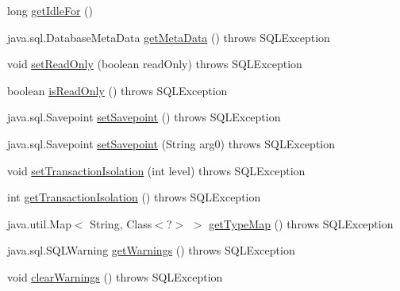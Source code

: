 \begin{DoxyCompactItemize}
long \mbox{\hyperlink{classcom_1_1mysql_1_1jdbc_1_1jdbc2_1_1optional_1_1_connection_wrapper_a5fe7514c30944bba398ec0412e78bd90}{get\+Idle\+For}} ()
\item 
java.\+sql.\+Database\+Meta\+Data \mbox{\hyperlink{classcom_1_1mysql_1_1jdbc_1_1jdbc2_1_1optional_1_1_connection_wrapper_a3f1b53d3626ae1b7897c99619155840f}{get\+Meta\+Data}} ()  throws S\+Q\+L\+Exception 
\item 
void \mbox{\hyperlink{classcom_1_1mysql_1_1jdbc_1_1jdbc2_1_1optional_1_1_connection_wrapper_ac530032d427efe9bd93fe09341ea0c9b}{set\+Read\+Only}} (boolean read\+Only)  throws S\+Q\+L\+Exception 
\item 
boolean \mbox{\hyperlink{classcom_1_1mysql_1_1jdbc_1_1jdbc2_1_1optional_1_1_connection_wrapper_a528d8fe8af6e92819391455e0e8e68ac}{is\+Read\+Only}} ()  throws S\+Q\+L\+Exception 
\item 
java.\+sql.\+Savepoint \mbox{\hyperlink{classcom_1_1mysql_1_1jdbc_1_1jdbc2_1_1optional_1_1_connection_wrapper_a6b97c71da72c7bb460e420e03078cb53}{set\+Savepoint}} ()  throws S\+Q\+L\+Exception 
\item 
java.\+sql.\+Savepoint \mbox{\hyperlink{classcom_1_1mysql_1_1jdbc_1_1jdbc2_1_1optional_1_1_connection_wrapper_ad8a366e0948f61c404409d7afdb45b31}{set\+Savepoint}} (String arg0)  throws S\+Q\+L\+Exception 
\item 
void \mbox{\hyperlink{classcom_1_1mysql_1_1jdbc_1_1jdbc2_1_1optional_1_1_connection_wrapper_a45569c2a7d764a6e309c4941099b9cfb}{set\+Transaction\+Isolation}} (int level)  throws S\+Q\+L\+Exception 
\item 
int \mbox{\hyperlink{classcom_1_1mysql_1_1jdbc_1_1jdbc2_1_1optional_1_1_connection_wrapper_a4b585cfb47f9b4d76ad31f1367808ad0}{get\+Transaction\+Isolation}} ()  throws S\+Q\+L\+Exception 
\item 
java.\+util.\+Map$<$ String, Class$<$?$>$ $>$ \mbox{\hyperlink{classcom_1_1mysql_1_1jdbc_1_1jdbc2_1_1optional_1_1_connection_wrapper_af88f3aad1e8bbf1555413acfb220bc8b}{get\+Type\+Map}} ()  throws S\+Q\+L\+Exception 
\item 
java.\+sql.\+S\+Q\+L\+Warning \mbox{\hyperlink{classcom_1_1mysql_1_1jdbc_1_1jdbc2_1_1optional_1_1_connection_wrapper_a9cfc6b7c60bc61e4abd338a1cc096d61}{get\+Warnings}} ()  throws S\+Q\+L\+Exception 
\item 
void \mbox{\hyperlink{classcom_1_1mysql_1_1jdbc_1_1jdbc2_1_1optional_1_1_connection_wrapper_aba9c23c688373ab8dac28e81b7eb8780}{clear\+Warnings}} ()  throws S\+Q\+L\+Exception 
\item 

\end{DoxyCompactItemize}
